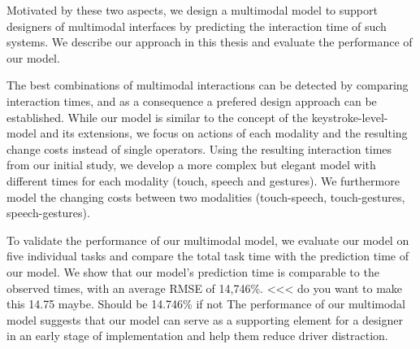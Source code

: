 Motivated by these two aspects, we design a multimodal model to support designers of multimodal interfaces by predicting the interaction time of such systems. We describe our approach in this thesis and evaluate the performance of our model.

The best combinations of multimodal interactions can be detected by comparing interaction times, and as a consequence a prefered design approach can be established.
While our model is similar to the concept of the keystroke-level-model and its extensions, we focus on actions of each modality and the resulting change costs instead of single operators.
Using the resulting interaction times from our initial study, we develop a more complex but elegant model with different times for each modality (touch, speech and gestures). 
We furthermore model the changing costs between two modalities (touch-speech, touch-gestures, speech-gestures).

To validate the performance of our multimodal model, we evaluate our model on five individual tasks and compare the total task time with the prediction time of our model.
We show that our model's prediction time is comparable to the observed times, with an average RMSE of 14,746\%. <<< do you want to make this 14.75 maybe. Should be 14.746\% if not 
The performance of our multimodal model suggests that our model can serve as a supporting element for a designer in an early stage of implementation and help them reduce driver distraction.
